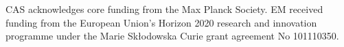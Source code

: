 \documentclass[gmd, manuscript]{copernicus}
\begin{document}


\appendixfigures  %

\appendixtables   %







\begin{acknowledgements}
CAS acknowledges core funding from the Max Planck Society. EM received funding from the European Union’s Horizon 2020 research and innovation programme under the Marie Skłodowska Curie grant agreement No 101110350. 
\end{acknowledgements}






%
%
%

 
 
\end{document}
